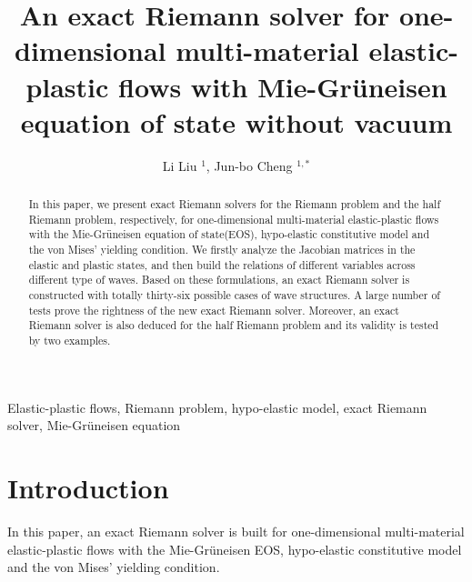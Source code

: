 \documentclass[review]{elsarticle}
\numberwithin{equation}{section}
\numberwithin{table}{section}
\begin{document}
\begin{frontmatter}

\title{An exact Riemann solver for one-dimensional multi-material elastic-plastic flows with Mie-Gr\"uneisen equation of state without vacuum}

\author{Li Liu $^1$, Jun-bo Cheng $^{1,*}$}


\address{$^1$  Institute of Applied Physics and Computational Mathematics, Beijing 100094, China }

\begin{abstract}
  In this paper, we present exact Riemann solvers for the Riemann problem and the half Riemann problem, respectively,  for one-dimensional multi-material elastic-plastic flows with the Mie-Gr\"uneisen equation of state(EOS), hypo-elastic constitutive model and  the von Mises' yielding condition. We firstly  analyze the Jacobian matrices in  the elastic and plastic states, and then build the  relations of  different variables across different type of waves. Based on these formulations, an exact Riemann solver is constructed with totally thirty-six possible cases of wave structures. 
  A large number of tests prove the rightness of the new  exact Riemann solver. Moreover, an exact Riemann solver is also deduced for the half Riemann problem and  its validity is tested  by two examples.
\end{abstract}

\begin{keyword}
  Elastic-plastic flows, Riemann problem, hypo-elastic model, exact Riemann solver, Mie-Gr\"uneisen equation
\end{keyword}

\end{frontmatter}

\section{Introduction}


In this paper, an exact Riemann solver is built for one-dimensional  multi-material elastic-plastic flows with the Mie-Gr\"uneisen EOS, hypo-elastic constitutive model \cite{wilkins1963calculation} and  the von Mises' yielding condition.
\end{document}
